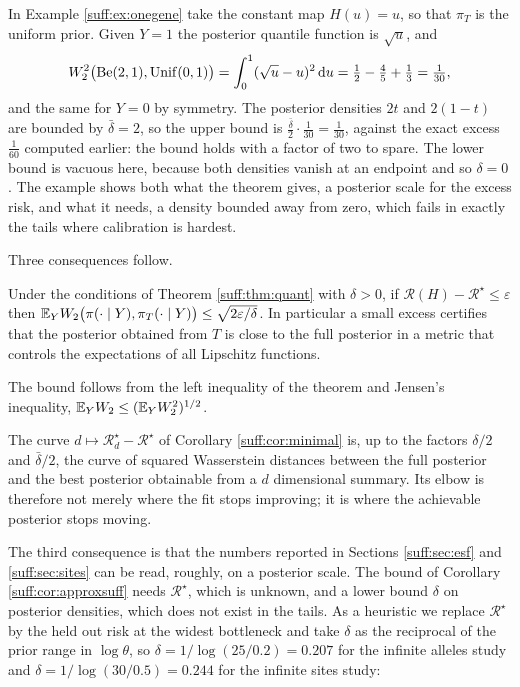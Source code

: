 \begin{example}
\label{suff:ex:onegene3}
In Example \ref{suff:ex:onegene} take the constant map $H(u)=u$, so that $\pi_T$ is the
uniform prior. Given $Y=1$ the posterior quantile function is $\sqrt u$, and
\[
W_2^2\big(\mathrm{Be}(2,1),\mathrm{Unif}(0,1)\big)=\int_0^1(\sqrt u-u)^2\,\mathrm{d} u
=\tfrac12-\tfrac45+\tfrac13=\tfrac1{30},
\]
and the same for $Y=0$ by symmetry. The posterior densities $2t$ and $2(1-t)$ are bounded by
$\bar\delta=2$, so the upper bound is $\tfrac{\bar\delta}{2}\cdot\tfrac1{30}=\tfrac1{30}$, against the exact
excess $\tfrac1{60}$ computed earlier: the bound holds with a factor of two to spare. The
lower bound is vacuous here, because both densities vanish at an endpoint and so $\delta=0$.
The example shows both what the theorem gives, a posterior scale for the excess risk, and what
it needs, a density bounded away from zero, which fails in exactly the tails where calibration
is hardest.
\end{example}

Three consequences follow.

\begin{corollary}
\label{suff:cor:approxsuff}
Under the conditions of Theorem \ref{suff:thm:quant} with $\delta>0$, if
$\mathcal{R}(H)-\mathcal{R}^\star\le\varepsilon$ then
$\mathbb{E}_Y W_2\big(\pi(\cdot\mid Y),\pi_T(\cdot\mid Y)\big)\le\sqrt{2\varepsilon/\delta}$. In
particular a small excess certifies that the posterior obtained from $T$ is close to the full
posterior in a metric that controls the expectations of all Lipschitz functions.
\end{corollary}

The bound follows from the left inequality of the theorem and Jensen's inequality,
$\mathbb{E}_Y W_2\le(\mathbb{E}_Y W_2^2)^{1/2}$.

\begin{corollary}
\label{suff:cor:curve}
The curve $d\mapsto\mathcal{R}^\star_d-\mathcal{R}^\star$ of Corollary \ref{suff:cor:minimal}
is, up to the factors $\delta/2$ and $\bar\delta/2$, the curve of squared Wasserstein distances between
the full posterior and the best posterior obtainable from a $d$ dimensional summary. Its elbow
is therefore not merely where the fit stops improving; it is where the achievable posterior
stops moving.
\end{corollary}

The third consequence is that the numbers reported in Sections \ref{suff:sec:esf} and
\ref{suff:sec:sites} can be read, roughly, on a posterior scale. The bound of Corollary
\ref{suff:cor:approxsuff} needs $\mathcal{R}^\star$, which is unknown, and a lower bound
$\delta$ on posterior densities, which does not exist in the tails. As a heuristic we replace
$\mathcal{R}^\star$ by the held out risk at the widest bottleneck and take $\delta$ as the reciprocal of
the prior range in $\log\theta$, so $\delta=1/\log(25/0.2)=0.207$ for the infinite alleles
study and $\delta=1/\log(30/0.5)=0.244$ for the infinite sites study:

